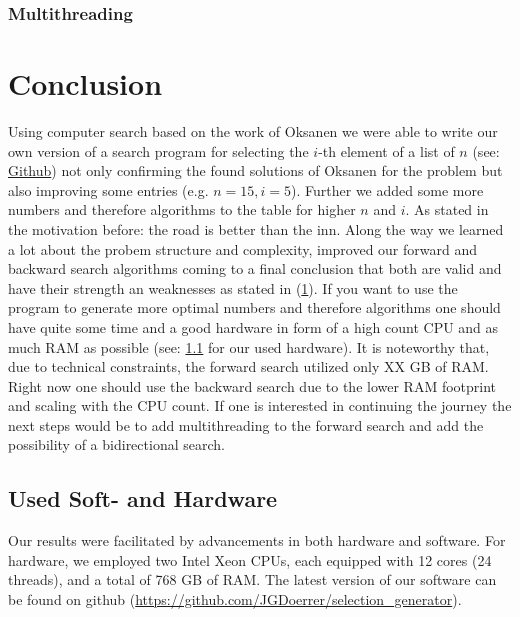 \documentclass[10pt,journal,compsoc]{IEEEtran}
\begin{document}
\subsubsection{Multithreading}


\section{Conclusion}
Using computer search based on the work of Oksanen we were able to write our own
version of a search program for selecting the $i$-th element of a list of $n$
(see: \href{https://github.com/JGDoerrer/selection_generator}{Github}) not only
confirming the found solutions of Oksanen for the problem but also improving
some entries (e.g. $n=15, i=5$). Further we added some more numbers and
therefore algorithms to the table for higher $n$ and $i$. As stated in the
motivation before: the road is better than the inn. Along the way we learned a
lot about the probem structure and complexity, improved our forward and backward
search algorithms coming to a final conclusion that both are valid and have
their strength an weaknesses as stated in (\ref{}). If you want to use the
program to generate more optimal numbers and therefore algorithms one should
have quite some time and a good hardware in form of a high count CPU and as much
RAM as possible (see: \ref{sec:hardware} for our used hardware). It is noteworthy
that, due to technical constraints, the forward search utilized only XX GB of RAM. %
Right now one should use
the backward search due to the lower RAM footprint and scaling with the CPU
count. If one is interested in continuing the journey the next steps would be to
add multithreading to the forward search and add the possibility of a
bidirectional search.


\subsection{Used Soft- and Hardware} \label{sec:hardware}

Our results were facilitated by advancements in both hardware and software.
For hardware, we employed two Intel Xeon CPUs, each equipped with 12 cores (24 threads), and a total of 768 GB of RAM. %
The latest version of our software can be found on github (\url{https://github.com/JGDoerrer/selection_generator}).

\end{document}
